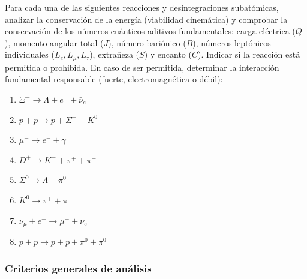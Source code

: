 \begin{problema}
Para cada una de las siguientes reacciones y desintegraciones subatómicas, analizar la conservación de la energía (viabilidad cinemática) y comprobar la conservación de los números cuánticos aditivos fundamentales: carga eléctrica ($Q$), momento angular total ($J$), número bariónico ($B$), números leptónicos individuales ($L_e, L_\mu, L_\tau$), extrañeza ($S$) y encanto ($C$). Indicar si la reacción está permitida o prohibida. En caso de ser permitida, determinar la interacción fundamental responsable (fuerte, electromagnética o débil):

\begin{enumerate}[label=\alph*)]
    \item $\Xi^- \to \Lambda + e^- + \bar{\nu}_e$
    \item $p + p \to p + \Sigma^+ + K^0$
    \item $\mu^- \to e^- + \gamma$
    \item $D^+ \to K^- + \pi^+ + \pi^+$
    \item $\Sigma^0 \to \Lambda + \pi^0$
    \item $K^0 \to \pi^+ + \pi^-$
    \item $\nu_\mu + e^- \to \mu^- + \nu_e$
    \item $p + p \to p + p + \pi^0 + \pi^0$
\end{enumerate}

\tcblower

\subsubsection*{Criterios generales de análisis}


\end{problema}
